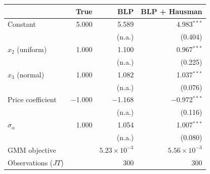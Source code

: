 \begin{tabular}{lrrr}
\toprule
 & True & BLP & BLP + Hausman \\
\midrule
Constant & 5.000 & 5.589 & 4.983$^{***}$ \\
 &  & (n.a.) & (0.404) \\
$x_2$ (uniform) & 1.000 & 1.100 & 0.967$^{***}$ \\
 &  & (n.a.) & (0.225) \\
$x_3$ (normal) & 1.000 & 1.082 & 1.037$^{***}$ \\
 &  & (n.a.) & (0.076) \\
Price coefficient & $-$1.000 & $-$1.168 & $-$0.972$^{***}$ \\
 &  & (n.a.) & (0.116) \\
$\sigma_\alpha$ & 1.000 & 1.054 & 1.007$^{***}$ \\
 &  & (n.a.) & (0.080) \\
\midrule
GMM objective &  & $5.23\times10^{-3}$ & $5.56\times10^{-3}$ \\
Observations ($JT$) &  & 300 & 300 \\
\bottomrule
\end{tabular}
